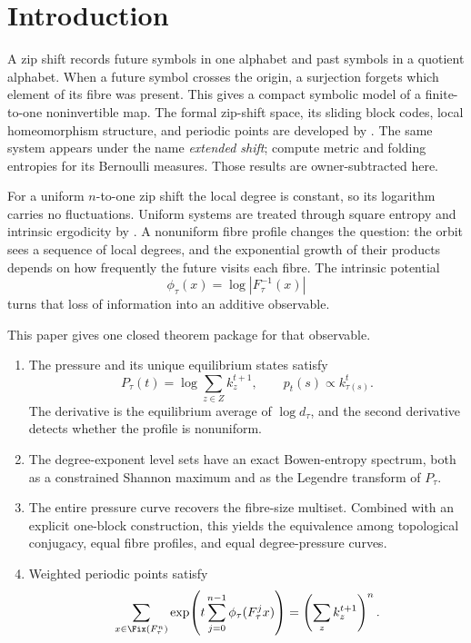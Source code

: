 \section{Introduction}

A zip shift records future symbols in one alphabet and past symbols in a
quotient alphabet.  When a future symbol crosses the origin, a surjection
forgets which element of its fibre was present.  This gives a compact
symbolic model of a finite-to-one noninvertible map.  The formal zip-shift
space, its sliding block codes, local homeomorphism structure, and periodic
points are developed by \citet{LameiMehdipour2025}.  The same system appears
under the name \emph{extended shift}; \citet{MartinsMattosVarao2026} compute
metric and folding entropies for its Bernoulli measures.  Those results are
owner-subtracted here.

For a uniform $n$-to-one zip shift the local degree is constant, so its
logarithm carries no fluctuations.  Uniform systems are treated through
square entropy and intrinsic ergodicity by
\citet{MehdipourJangjooye2025}.  A nonuniform fibre profile changes the
question: the orbit sees a sequence of local degrees, and the exponential
growth of their products depends on how frequently the future visits each
fibre.  The intrinsic potential
\[
 \phi_\tau(x)=\log |F_\tau^{-1}(x)|
\]
turns that loss of information into an additive observable.

This paper gives one closed theorem package for that observable.
\begin{enumerate}
\item The pressure and its unique equilibrium states satisfy
\[
P_\tau(t)=\log\sum_{z\in Z}k_z^{t+1},\qquad
p_t(s)\propto k_{\tau(s)}^t.
\]
The derivative is the equilibrium average of $\log d_\tau$, and the second
derivative detects whether the profile is nonuniform.
\item The degree-exponent level sets have an exact Bowen-entropy spectrum,
both as a constrained Shannon maximum and as the Legendre transform of
$P_\tau$.
\item The entire pressure curve recovers the fibre-size multiset.  Combined
with an explicit one-block construction, this yields the equivalence among
topological conjugacy, equal fibre profiles, and equal degree-pressure
curves.
\item Weighted periodic points satisfy
\[
 \sum_{x\in\Fix(F_\tau^n)}
 \exp\!\left(t\sum_{j=0}^{n-1}\phi_\tau(F_\tau^j x)\right)
 =\left(\sum_z k_z^{t+1}\right)^n.
\]
\end{enumerate}


